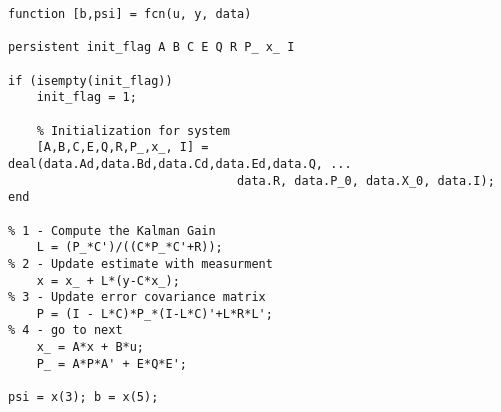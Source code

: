 \begin{lstlisting}
function [b,psi] = fcn(u, y, data)

persistent init_flag A B C E Q R P_ x_ I 

if (isempty(init_flag))
    init_flag = 1;
    
    % Initialization for system
    [A,B,C,E,Q,R,P_,x_, I] = deal(data.Ad,data.Bd,data.Cd,data.Ed,data.Q, ...
                                data.R, data.P_0, data.X_0, data.I);
end

% 1 - Compute the Kalman Gain
    L = (P_*C')/((C*P_*C'+R));
% 2 - Update estimate with measurment
    x = x_ + L*(y-C*x_);
% 3 - Update error covariance matrix
    P = (I - L*C)*P_*(I-L*C)'+L*R*L';
% 4 - go to next
    x_ = A*x + B*u;
    P_ = A*P*A' + E*Q*E';

psi = x(3); b = x(5);
\end{lstlisting}

